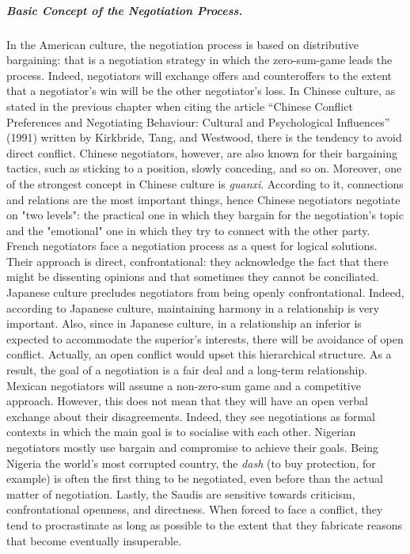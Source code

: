 \documentclass[../main.tex]{subfiles}
\begin{document}
\subparagraph{Basic Concept of the Negotiation Process.} In the American culture, the negotiation process is based on distributive bargaining: that is a negotiation strategy in which the zero-sum-game leads the process. Indeed, negotiators will exchange offers and counteroffers to the extent that a negotiator's win will be the other negotiator's loss. In Chinese culture, as stated in the previous chapter when citing the article “Chinese Conflict Preferences and Negotiating Behaviour: Cultural and Psychological Influences” (1991) written by Kirkbride, Tang, and Westwood\cite{tang}, there is the tendency to avoid direct conflict. Chinese negotiators, however, are also known for their bargaining tactics, such as sticking to a position, slowly conceding, and so on. Moreover, one of the strongest concept in Chinese culture is \textit{guanxi}. According to it, connections and relations are the most important things, hence Chinese negotiators negotiate on "two levels": the practical one in which they bargain for the negotiation's topic and the "emotional" one in which they try to connect with the other party. French negotiators face a negotiation process as a quest for logical solutions. Their approach is direct, confrontational: they acknowledge the fact that there might be dissenting opinions and that sometimes they cannot be conciliated. Japanese culture precludes negotiators from being openly confrontational. Indeed, according to Japanese culture, maintaining harmony in a relationship is very important. Also, since in Japanese culture, in a relationship an inferior is expected to accommodate the superior's interests, there will be avoidance of open conflict. Actually, an open conflict would upset this hierarchical structure. As a result, the goal of a negotiation is a fair deal and a long-term relationship. Mexican negotiators will assume a non-zero-sum game and a competitive approach. However, this does not mean that they will have an open verbal exchange about their disagreements. Indeed, they see negotiations as formal contexts in which the main goal is to socialise with each other. Nigerian negotiators mostly use bargain and compromise to achieve their goals. Being Nigeria the world's most corrupted country, the \textit{dash} (to buy protection, for example) is often the first thing to be negotiated, even before than the actual matter of negotiation. Lastly, the Saudis are sensitive towards criticism, confrontational openness, and directness. When forced to face a conflict, they tend to procrastinate as long as possible to the extent that they fabricate reasons that become eventually insuperable.
\end{document}
